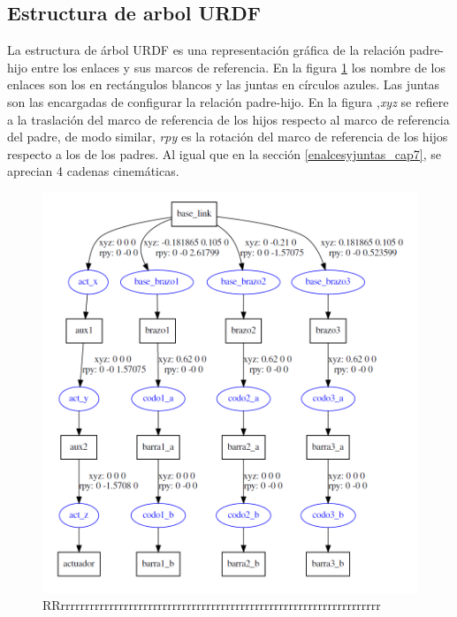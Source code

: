 \newpage

    \subsection{Estructura de arbol URDF}
    La estructura de árbol URDF es una representación gráfica de la relación padre-hijo entre los enlaces y sus marcos de referencia. En la figura \ref{f:cap7_rviz_12341} los nombre de los enlaces son los en rectángulos blancos y las juntas en círculos azules. Las juntas son las encargadas de configurar la relación padre-hijo. En la figura ,\textit{xyz} se refiere a la traslación del marco de referencia de los hijos respecto al marco de referencia del padre, de modo similar, \textit{rpy} es la rotación del marco de referencia de los hijos respecto a los de los padres. Al igual que en la sección \ref{enalcesyjuntas_cap7}, se aprecian 4 cadenas cinemáticas.

        \begin{figure}[h]
            \centering
            \includegraphics[width=1.0\linewidth]{Main/Chapter7/Images7/rviz_1.png}
            \caption{RRrrrrrrrrrrrrrrrrrrrrrrrrrrrrrrrrrrrrrrrrrrrrrrrrrrrrrrrrrrrrrrrrrr}
            \label{f:cap7_rviz_12341}
        \end{figure}  
    
